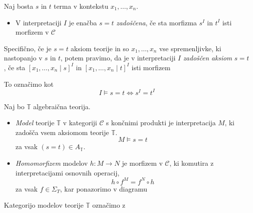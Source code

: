\documentclass[../kategoricna_logika.tex]{subfiles}
\begin{document}
\begin{definicija}
  Naj bosta $s$ in $t$ terma v kontekstu $x_1, \ldots, x_n$.
  \begin{itemize}
  \item V interpretaciji $I$ je enačba $s = t$ \emph{zadoščena}, če
    sta morfizma $s^I$ in $t^I$ isti morfizem v $\mathcal{C}$
  \end{itemize}
%
  Specifično, če je $s = t$ aksiom teorije in so $x_1, \ldots, x_n$
  vse spremenljivke, ki nastopanjo v $s$ in $t$, potem pravimo, da je
  v interpretaciji $I$ \emph{zadoščen aksiom} $s = t$, če sta
  $[x_1, \ldots, x_n \mid s]^I$ in $[x_1, \ldots, x_n \mid t]^I$ isti
  morfizem
  \begin{center}
  \end{center}
%
  To označimo kot
$$I \models s = t \Longleftrightarrow s^I = t^I$$
\end{definicija}
%
\begin{definicija}
  Naj bo $\mathbb{T}$ algebraična teorija.
  \begin{itemize}
%
  \item \emph{Model} teorije $\mathbb{T}$ v kategoriji $\mathcal{C}$ s
    končnimi produkti je interpretacija $M$, ki zadošča vsem aksiomom
    teorije $\mathbb{T}$.
$$M \models s = t$$ za vsak $(s = t) \in A_\mathbb{T}$.
\end{itemize}
\end{definicija}
%
\begin{definicija}
  \begin{itemize}
  \item \emph{Homomorfizem} modelov $h : M \to N$ je morfizem v
    $\mathcal{C}$, ki komutira z interpretacijami osnovnih operacij,
$$h \circ f^M = f^N \circ h$$
za vsak $f \in \Sigma_T$, kar ponazorimo v diagramu
\begin{center}
\end{center}
\end{itemize}
\end{definicija}
%
Kategorijo modelov teorije $\mathbb{T}$ označimo z
\end{document}
